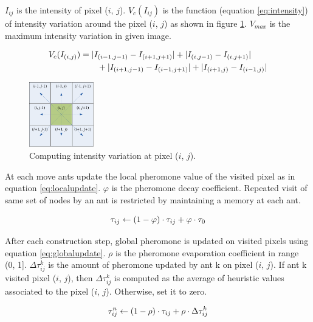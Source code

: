 \documentclass{llncs}
\begin{document}
	$I_{ij}$ is the intensity of pixel ($i$, $j$). $V_c(I_{ij})$ is the function (equation \eqref{eq:intensity}) of intensity variation around the pixel ($i$, $j$) as shown in figure \ref{fig:pixelConf}. $V_{max}$ is the maximum intensity variation in given image.
	
	\begin{align}
		\centering
		V_c(I_{(i, j)}) &= |I_{(i-1, j-1)} - I_{(i+1, j+1)}| + |I_{(i, j-1)} - I_{(i, j+1)}| \nonumber \\
		&\qquad + |I_{(i+1, j-1)} - I_{(i-1, j+1)}| + |I_{(i+1, j)} - I_{(i-1, j)}|
		\label{eq:intensity}
	\end{align}
	
	\begin{figure}[H]
		\centering
		\includegraphics[width=0.25\textwidth]{IMG/NeighboringPixels}
		\caption{Computing intensity variation at pixel ($i$, $j$). \cite{Anna:2010}}
		\label{fig:pixelConf}
	\end{figure}

	At each move ants update the local pheromone value of the visited pixel as in equation \eqref{eq:localupdate}. $\varphi$ is the pheromone decay coefficient. Repeated visit of same set of nodes by an ant is restricted by maintaining a memory at each ant. 
	
	\begin{equation}
		\centering
		\tau_{ij} \leftarrow (1 - \varphi) \cdot \tau_{ij} + \varphi \cdot \tau_{0}
		\label{eq:localupdate}
	\end{equation}
	
	After each construction step, global pheromone is updated on visited pixels using equation \eqref{eq:globalupdate}. $\rho$ is the pheromone evaporation coefficient in range (0, 1]. $\Delta \tau^{k}_{ij}$ is the amount of pheromone updated by ant k on pixel ($i$, $j$). If ant k visited pixel ($i$, $j$), then  $\Delta \tau^{k}_{ij}$ is computed as the average of heuristic values associated to the pixel ($i$, $j$). Otherwise, set it to zero.
	
	\begin{equation}
		\centering
		\tau^{n}_{ij} \leftarrow (1 - \rho) \cdot \tau_{ij} + \rho \cdot \Delta \tau^{k}_{ij}
		\label{eq:globalupdate}
	\end{equation}
	
\end{document}

